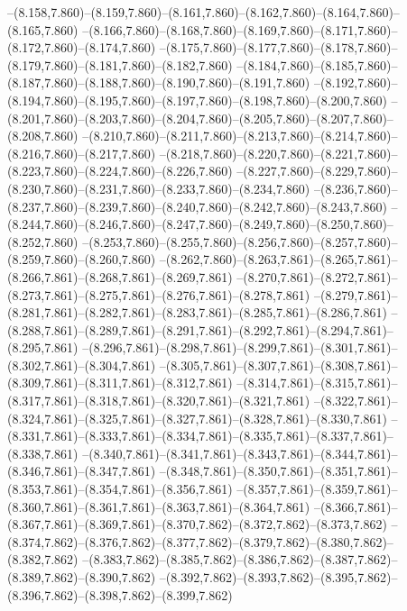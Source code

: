   --(8.158,7.860)--(8.159,7.860)--(8.161,7.860)--(8.162,7.860)--(8.164,7.860)--(8.165,7.860)%
  --(8.166,7.860)--(8.168,7.860)--(8.169,7.860)--(8.171,7.860)--(8.172,7.860)--(8.174,7.860)%
  --(8.175,7.860)--(8.177,7.860)--(8.178,7.860)--(8.179,7.860)--(8.181,7.860)--(8.182,7.860)%
  --(8.184,7.860)--(8.185,7.860)--(8.187,7.860)--(8.188,7.860)--(8.190,7.860)--(8.191,7.860)%
  --(8.192,7.860)--(8.194,7.860)--(8.195,7.860)--(8.197,7.860)--(8.198,7.860)--(8.200,7.860)%
  --(8.201,7.860)--(8.203,7.860)--(8.204,7.860)--(8.205,7.860)--(8.207,7.860)--(8.208,7.860)%
  --(8.210,7.860)--(8.211,7.860)--(8.213,7.860)--(8.214,7.860)--(8.216,7.860)--(8.217,7.860)%
  --(8.218,7.860)--(8.220,7.860)--(8.221,7.860)--(8.223,7.860)--(8.224,7.860)--(8.226,7.860)%
  --(8.227,7.860)--(8.229,7.860)--(8.230,7.860)--(8.231,7.860)--(8.233,7.860)--(8.234,7.860)%
  --(8.236,7.860)--(8.237,7.860)--(8.239,7.860)--(8.240,7.860)--(8.242,7.860)--(8.243,7.860)%
  --(8.244,7.860)--(8.246,7.860)--(8.247,7.860)--(8.249,7.860)--(8.250,7.860)--(8.252,7.860)%
  --(8.253,7.860)--(8.255,7.860)--(8.256,7.860)--(8.257,7.860)--(8.259,7.860)--(8.260,7.860)%
  --(8.262,7.860)--(8.263,7.861)--(8.265,7.861)--(8.266,7.861)--(8.268,7.861)--(8.269,7.861)%
  --(8.270,7.861)--(8.272,7.861)--(8.273,7.861)--(8.275,7.861)--(8.276,7.861)--(8.278,7.861)%
  --(8.279,7.861)--(8.281,7.861)--(8.282,7.861)--(8.283,7.861)--(8.285,7.861)--(8.286,7.861)%
  --(8.288,7.861)--(8.289,7.861)--(8.291,7.861)--(8.292,7.861)--(8.294,7.861)--(8.295,7.861)%
  --(8.296,7.861)--(8.298,7.861)--(8.299,7.861)--(8.301,7.861)--(8.302,7.861)--(8.304,7.861)%
  --(8.305,7.861)--(8.307,7.861)--(8.308,7.861)--(8.309,7.861)--(8.311,7.861)--(8.312,7.861)%
  --(8.314,7.861)--(8.315,7.861)--(8.317,7.861)--(8.318,7.861)--(8.320,7.861)--(8.321,7.861)%
  --(8.322,7.861)--(8.324,7.861)--(8.325,7.861)--(8.327,7.861)--(8.328,7.861)--(8.330,7.861)%
  --(8.331,7.861)--(8.333,7.861)--(8.334,7.861)--(8.335,7.861)--(8.337,7.861)--(8.338,7.861)%
  --(8.340,7.861)--(8.341,7.861)--(8.343,7.861)--(8.344,7.861)--(8.346,7.861)--(8.347,7.861)%
  --(8.348,7.861)--(8.350,7.861)--(8.351,7.861)--(8.353,7.861)--(8.354,7.861)--(8.356,7.861)%
  --(8.357,7.861)--(8.359,7.861)--(8.360,7.861)--(8.361,7.861)--(8.363,7.861)--(8.364,7.861)%
  --(8.366,7.861)--(8.367,7.861)--(8.369,7.861)--(8.370,7.862)--(8.372,7.862)--(8.373,7.862)%
  --(8.374,7.862)--(8.376,7.862)--(8.377,7.862)--(8.379,7.862)--(8.380,7.862)--(8.382,7.862)%
  --(8.383,7.862)--(8.385,7.862)--(8.386,7.862)--(8.387,7.862)--(8.389,7.862)--(8.390,7.862)%
  --(8.392,7.862)--(8.393,7.862)--(8.395,7.862)--(8.396,7.862)--(8.398,7.862)--(8.399,7.862)%
